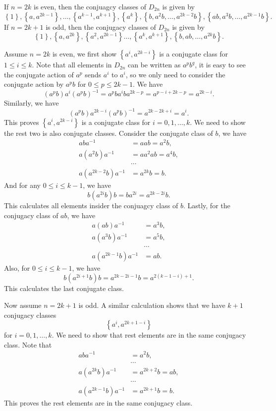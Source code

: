 \documentclass[a4paper, 12pt]{article}
\begin{document}
\begin{solution}
\begin{enumerate}[(1)]
\begin{claim}
If \(n=2k\) is even, then the conjuagcy classes of \(D_{2n}\) is given by 
\[\left\{ 1 \right\},\left\{ a,a^{2k-1} \right\},\ldots,\left\{ a^{k-1},a^{k+1} \right\},\left\{ a^k \right\},\left\{ b,a^2b,\ldots,a^{2k-2}b \right\},\left\{ ab,a^3b,\ldots,a^{2k-1}b \right\}.\]
If \(n=2k+1\) is odd, then the conjugacy classes of \(D_{2n}\) is given by 
\[\left\{ 1 \right\},\left\{ a,a^{2k} \right\},\left\{ a^2,a^{2k-1} \right\}\ldots,\left\{ a^k,a^{k+1} \right\},\left\{ b,ab,\ldots,a^{2k}b \right\}.\]
\end{claim}
\begin{claimproof}
Assume \(n=2k\) is even, we first show \(\left\{ a^i,a^{2k-i} \right\}\) is a conjugate class for \(1\leq i\leq k\). Note that all elements in \(D_{2n}\) can be written as \(a^pb^q\), it is easy to see the conjugate action of \(a^p\) sends \(a^i\) to \(a^i\), so we only need to consider the conjugate action by \(a^p b\) for \(0\leq p\leq 2k-1\). We have 
\[(a^p b) a^i (a^pb)^{-1}=a^pba^iba^{2k-p}=a^{p-i+2k-p}=a^{2k-i}.\]
Similarly, we have 
\[(a^pb)a^{2k-i}(a^pb)^{-1}=a^{2k-2k+i}=a^i.\] 
This proves \(\left\{ a^i,a^{2k-i} \right\}\) is a conjugate class for \(i=0,1,\ldots,k\). We need to show the rest two is also conjugate classes. Consider the conjugate class of \(b\), we have 
\begin{align*}
	aba^{-1}&=aab=a^2b,\\ 
	a(a^2b)a^{-1}&=aa^2ab=a^4b,\\ 
	&\cdots\\ 
	a(a^{2k-2}b)a^{-1}&=a^{2k}b=b.
\end{align*}
And for any \(0\leq i\leq k-1\), we have 
\[b(a^{2i}b)b=ba^{2i}=a^{2k-2i}b.\]
This calculates all elements insider the conjuagcy class of \(b\). Lastly, for the conjugacy class of \(ab\), we have 
\begin{align*}
	a(ab)a^{-1}&=a^3b,\\ 
	a(a^3b)a^{-1}&=a^5b,\\ 
	&\cdots\\ 
	a(a^{2k-1}b)a^{-1}&=ab.
\end{align*}
Also, for \(0\leq i\leq k-1\), we have 
\[b(a^{2i+1}b)b=a^{2k-2i-1}b=a^{2(k-1-i)+1}.\]
This calculates the last conjugate class. 

Now assume \(n=2k+1\) is odd. A similar calculation shows that we have \(k+1\) conjugacy classes 
\[\left\{ a^i,a^{2k+1-i} \right\}\]
for \(i=0,1,\ldots,k\). We need to show that rest elements are in the same conjugacy class. Note that 
\begin{align*}
	aba^{-1}&=a^2b,\\ 
	&\cdots\\ 
	a(a^{2k}b)a^{-1}&=a^{2k+2}b=ab,\\ 
	&\cdots\\ 
	a(a^{2k-1}b)a^{-1}&=a^{2k+1}b=b.
\end{align*}
This proves the rest elements are in the same conjugacy class.
\end{claimproof}


\end{enumerate}
\end{solution}
\end{document}

